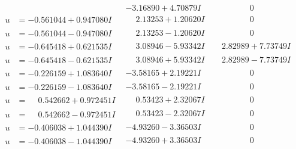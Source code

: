 \documentclass[1p]{elsarticle_modified}
\theoremstyle{definition}
\begin{document}
$$\begin{array}{c|c|c}
 & -3.16890 + 4.70879 I & \phantom{-0.000000 } 0 \\ \hline\begin{aligned}
u &= -0.561044 + 0.947080 I\end{aligned}
 & \phantom{-}2.13253 + 1.20620 I & \phantom{-0.000000 } 0 \\ \hline\begin{aligned}
u &= -0.561044 - 0.947080 I\end{aligned}
 & \phantom{-}2.13253 - 1.20620 I & \phantom{-0.000000 } 0 \\ \hline\begin{aligned}
u &= -0.645418 + 0.621535 I\end{aligned}
 & \phantom{-}3.08946 - 5.93342 I & \phantom{-}2.82989 + 7.73749 I \\ \hline\begin{aligned}
u &= -0.645418 - 0.621535 I\end{aligned}
 & \phantom{-}3.08946 + 5.93342 I & \phantom{-}2.82989 - 7.73749 I \\ \hline\begin{aligned}
u &= -0.226159 + 1.083640 I\end{aligned}
 & -3.58165 + 2.19221 I & \phantom{-0.000000 } 0 \\ \hline\begin{aligned}
u &= -0.226159 - 1.083640 I\end{aligned}
 & -3.58165 - 2.19221 I & \phantom{-0.000000 } 0 \\ \hline\begin{aligned}
u &= \phantom{-}0.542662 + 0.972451 I\end{aligned}
 & \phantom{-}0.53423 + 2.32067 I & \phantom{-0.000000 } 0 \\ \hline\begin{aligned}
u &= \phantom{-}0.542662 - 0.972451 I\end{aligned}
 & \phantom{-}0.53423 - 2.32067 I & \phantom{-0.000000 } 0 \\ \hline\begin{aligned}
u &= -0.406038 + 1.044390 I\end{aligned}
 & -4.93260 - 3.36503 I & \phantom{-0.000000 } 0 \\ \hline\begin{aligned}
u &= -0.406038 - 1.044390 I\end{aligned}
 & -4.93260 + 3.36503 I & \phantom{-0.000000 } 0 \\ \hline\begin{aligned}

\end{aligned}
\end{array}$$
\end{document}
